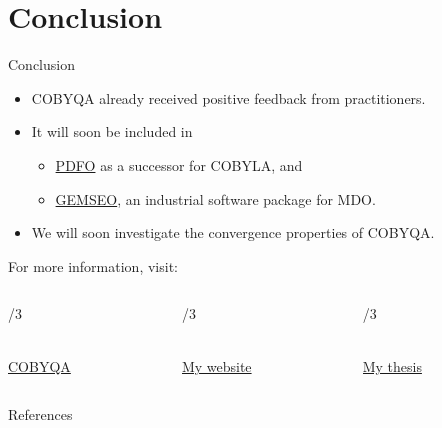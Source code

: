 \documentclass[optimization]{common/talk}
\begin{document}
\section{Conclusion}

\begin{frame}{Conclusion}

    \begin{itemize}
        \item COBYQA already received \alert{positive} feedback from practitioners.
        \item It will soon be included in
        \begin{itemize}
            \item \href{https://www.pdfo.net}{PDFO} as a successor for COBYLA, and
            \item \href{https://gemseo.readthedocs.io}{GEMSEO}, an \alert{industrial} software package for MDO.
        \end{itemize}
        \item We will soon investigate the convergence properties of COBYQA.
    \end{itemize}

    For more information, visit:

    \medskip

    \begin{columns}
        \begin{column}{\textwidth/3}
            \begin{center}
                \\[1ex]
                \href{https://www.cobyqa.com}{COBYQA}
            \end{center}
        \end{column}
        \begin{column}{\textwidth/3}
            \begin{center}
                \\[1ex]
                \href{https://www.tomragonneau.com}{My website}
            \end{center}
        \end{column}
        \begin{column}{\textwidth/3}
            \begin{center}
                \\[1ex]
                \href{https://tomragonneau.com/documents/thesis.pdf}{My thesis}
            \end{center}
        \end{column}
    \end{columns}
\end{frame}

\appendix

\begin{frame}[allowframebreaks]{References}
    
\end{frame}
\end{document}
